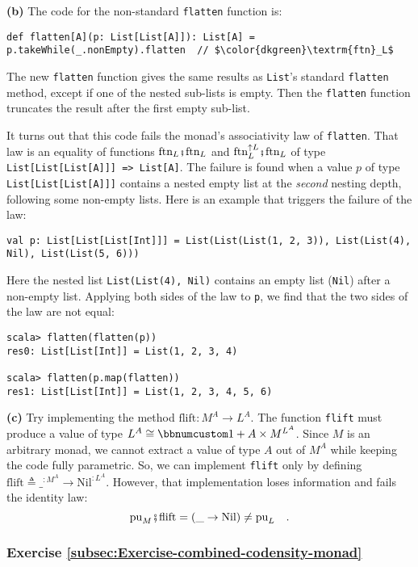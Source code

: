 \textbf{(b)} The code for the non-standard \lstinline!flatten! function
is:
\begin{lstlisting}[mathescape=true]
def flatten[A](p: List[List[A]]): List[A] = p.takeWhile(_.nonEmpty).flatten  // $\color{dkgreen}\textrm{ftn}_L$
\end{lstlisting}
The new \lstinline!flatten! function gives  the same results as \lstinline!List!\textsf{'}s
standard \lstinline!flatten! method, except if one of the nested
sub-lists is empty. Then the \lstinline!flatten! function truncates
the result after the first empty sub-list.

It turns out that this code fails the monad\textsf{'}s associativity law of
\lstinline!flatten!. That law is an equality of functions $\text{ftn}_{L}\bef\text{ftn}_{L}$
and $\text{ftn}_{L}^{\uparrow L}\bef\text{ftn}_{L}$ of type \lstinline!List[List[List[A]]] => List[A]!.
The failure is found when a value $p$ of type \lstinline!List[List[List[A]]]!
contains a nested empty list at the \emph{second} nesting depth, following
some non-empty lists. Here is an example that triggers the failure
of the law:
\begin{lstlisting}
val p: List[List[List[Int]]] = List(List(List(1, 2, 3)), List(List(4), Nil), List(List(5, 6)))
\end{lstlisting}
Here the nested list \lstinline!List(List(4), Nil)! contains an empty
list (\lstinline!Nil!) after a non-empty list. Applying both sides
of the law to \lstinline!p!, we find that the two sides of the law
are not equal:
\begin{lstlisting}
scala> flatten(flatten(p))
res0: List[List[Int]] = List(1, 2, 3, 4)

scala> flatten(p.map(flatten))
res1: List[List[Int]] = List(1, 2, 3, 4, 5, 6)
\end{lstlisting}

\textbf{(c)} Try implementing the method $\text{flift}:M^{A}\rightarrow L^{A}$.
The function \lstinline!flift! must produce a value of type $L^{A}\cong\bbnum 1+A\times M^{L^{A}}$.
Since $M$ is an arbitrary monad, we cannot extract a value of type
$A$ out of $M^{A}$ while keeping the code fully parametric. So,
we can implement \lstinline!flift! only by defining $\text{flift}\triangleq\_^{:M^{A}}\rightarrow\text{Nil}^{:L^{A}}$.
However, that implementation loses information and fails the identity
law:
\[
\text{pu}_{M}\bef\text{flift}=(\_\rightarrow\text{Nil})\neq\text{pu}_{L}\quad.
\]


\subsubsection*{Exercise \ref{subsec:Exercise-combined-codensity-monad}}

